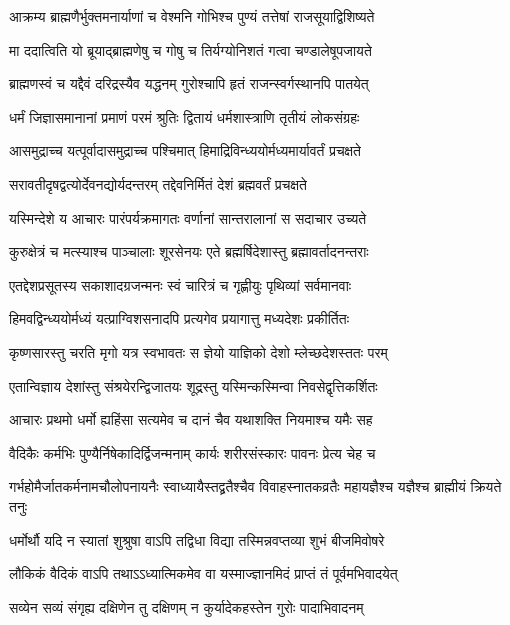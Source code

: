 \twolineshloka
{आक्रम्य ब्राह्मणैर्भुक्तमनार्याणां च वेश्मनि}
{गोभिश्च पुण्यं तत्तेषां राजसूयाद्विशिष्यते}


\twolineshloka
{मा ददात्विति यो ब्रूयाद्ब्राह्मणेषु च गोषु च}
{तिर्यग्योनिशतं गत्वा चण्डालेषूपजायते}


\twolineshloka
{ब्राह्मणस्वं च यद्दैवं दरिद्रस्यैव यद्धनम्}
{गुरोश्चापि हृतं राजन्स्वर्गस्थानपि पातयेत्}


\twolineshloka
{धर्मं जिज्ञासमानानां प्रमाणं परमं श्रुतिः}
{द्वितायं धर्मशास्त्राणि तृतीयं लोकसंग्रहः}


\twolineshloka
{आसमुद्राच्च यत्पूर्वादासमुद्राच्च पश्चिमात्}
{हिमाद्रिविन्ध्ययोर्मध्यमार्यावर्तं प्रचक्षते}


\twolineshloka
{सरावतीदृषद्वत्योर्देवनद्योर्यदन्तरम्}
{तद्देवनिर्मितं देशं ब्रह्मवर्तं प्रचक्षते}


\twolineshloka
{यस्मिन्देशे य आचारः पारंपर्यक्रमागतः}
{वर्णानां सान्तरालानां स सदाचार उच्यते}


\twolineshloka
{कुरुक्षेत्रं च मत्स्याश्च पाञ्चालाः शूरसेनयः}
{एते ब्रह्मर्षिदेशास्तु ब्रह्मावर्तादनन्तराः}


\twolineshloka
{एतद्देशप्रसूतस्य सकाशादग्रजन्मनः}
{स्वं चारित्रं च गृह्णीयुः पृथिव्यां सर्वमानवाः}


\twolineshloka
{हिमवद्विन्ध्ययोर्मध्यं यत्प्राग्विशसनादपि}
{प्रत्यगेव प्रयागात्तु मध्यदेशः प्रकीर्तितः}


\twolineshloka
{कृष्णसारस्तु चरति मृगो यत्र स्वभावतः}
{स ज्ञेयो याज्ञिको देशो म्लेच्छदेशस्ततः परम्}


\twolineshloka
{एतान्विज्ञाय देशांस्तु संश्रयेरन्द्विजातयः}
{शूद्रस्तु यस्मिन्कस्मिन्वा निवसेद्वृत्तिकर्शितः}


\twolineshloka
{आचारः प्रथमो धर्मो ह्यहिंसा सत्यमेव च}
{दानं चैव यथाशक्ति नियमाश्च यमैः सह}


\twolineshloka
{वैदिकैः कर्मभिः पुण्यैर्निषेकादिर्द्विजन्मनाम्}
{कार्यः शरीरसंस्कारः पावनः प्रेत्य चेह च}


\threelineshloka
{गर्भहोमैर्जातकर्मनामचौलोपनायनैः}
{स्वाध्यायैस्तद्व्रतैश्चैव विवाहस्नातकव्रतैः}
{महायज्ञैश्च यज्ञैश्च ब्राह्मीयं क्रियते तनुः}


\twolineshloka
{धर्मोर्थौ यदि न स्यातां शुश्रुषा वाऽपि तद्विधा}
{विद्या तस्मिन्नवप्तव्या शुभं बीजमिवोषरे}


\twolineshloka
{लौकिकं वैदिकं वाऽपि तथाऽऽध्यात्मिकमेव वा}
{यस्माज्ज्ञानमिदं प्राप्तं तं पूर्वमभिवादयेत्}


\twolineshloka
{सव्येन सव्यं संगृह्य दक्षिणेन तु दक्षिणम्}
{न कुर्यादेकहस्तेन गुरोः पादाभिवादनम्}



